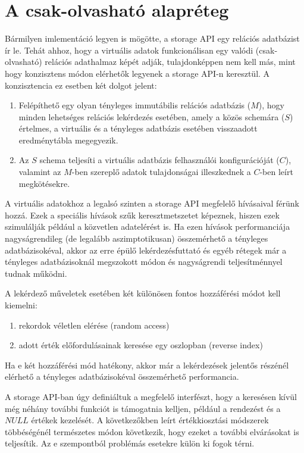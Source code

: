 \documentclass[
    parspace, %
    noindent, %
]{elteiktdk}[2023/10/30]
\begin{document}

\section{A csak-olvasható alapréteg}

Bármilyen imlementáció legyen is mögötte, a storage API egy relációs adatbázist ír le.
Tehát ahhoz, hogy a virtuális adatok funkcionálisan egy valódi (csak-olvasható) relációs adathalmaz képét adják,
tulajdonképpen nem kell más, mint hogy konzisztens módon elérhetők legyenek a storage API-n keresztül.
A konzisztencia ez esetben két dolgot jelent:

\begin{enumerate}
  \item Felépíthető egy olyan tényleges immutábilis relációs adatbázis ($M$),
        hogy minden lehetséges relációs lekérdezés esetében, amely a közös schemára ($S$) értelmes,
        a virtuális és a tényleges adatbázis esetében visszaadott eredménytábla megegyezik.
  \item Az $S$ schema teljesíti a virtuális adatbázis felhasználói konfigurációját ($C$),
        valamint az $M$-ben szereplő adatok tulajdonságai illeszkednek a $C$-ben leírt megkötésekre.
\end{enumerate}

A virtuális adatokhoz a legalsó szinten a storage API megfelelő hívásaival férünk hozzá.
Ezek a speciális hívások szűk keresztmetszetet képeznek,
hiszen ezek szimulálják például a közvetlen adatelérést is.
Ha ezen hívások performanciája nagyságrendileg (de legalább aszimptotikusan) összemérhető a tényleges adatbázisokéval,
akkor az erre épülő lekérdezésfuttató és egyéb rétegek már
a tényleges adatbázisoknál megszokott módon és nagyságrendi teljesítménnyel tudnak működni.

A lekérdező műveletek esetében két különösen fontos hozzáférési módot kell kiemelni:

\begin{enumerate}
  \item rekordok véletlen elérése (random access)
  \item adott érték előfordulásainak keresése egy oszlopban (reverse index)
\end{enumerate}

Ha e két hozzáférési mód hatékony, akkor már a lekérdezések jelentős részénél
elérhető a tényleges adatbázisokéval összemérhető performancia.

A storage API-ban úgy definiáltuk a megfelelő interfészt,
hogy a keresésen kívül még néhány további funkciót is támogatnia kelljen,
például a rendezést és a $NULL$ értékek kezelését.
A következőkben leírt értékkiosztási módszerek többéségénél természetes módon következik,
hogy ezeket a további elvárásokat is teljesítik.
Az e szempontból problémás esetekre külön ki fogok térni.
\end{document}
